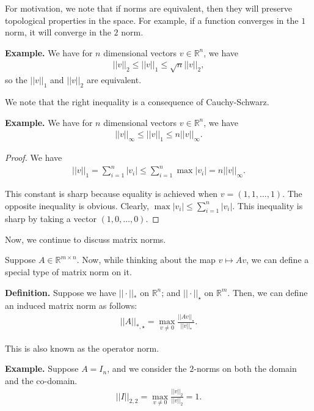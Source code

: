\documentclass{article}
\newcommand{\RR}{\mathbb{R}}
\begin{document}
For motivation, we note that if norms are equivalent, then they will preserve topological properties in the space.  For example, if a function converges in the $1$ norm, it will converge in the $2$ norm.

{\bf Example.} We have for $n$ dimensional vectors $v \in \RR^n$, we have
\begin{align*}
  ||v||_2 \leq ||v||_1 \leq \sqrt{n} ||v||_2,
\end{align*}
so the $||v||_1$ and $||v||_2$ are equivalent.

We note that the right inequality is a consequence of Cauchy-Schwarz.

{\bf Example.} We have for $n$ dimensional vectors $v \in \RR^n$, we have
\begin{align*}
  ||v||_{\infty} \leq ||v||_1 \leq n ||v||_{\infty}.
\end{align*}

\begin{proof}
  We have
  \begin{align*}
    ||v||_1 = \sum_{i=1}^{n} |v_i| \leq \sum_{i=1}^{n} \max |v_i| = n ||v||_{\infty}.
  \end{align*}

  This constant is sharp because equality is achieved when $v = (1, 1, \dots, 1)$.  
  The opposite inequality is obvious.  Clearly, $\max |v_i| \leq \sum_{i=1}^{n} |v_i|$.  This inequality is sharp by taking a vector $(1, 0, \dots, 0)$.
\end{proof}

Now, we continue to discuss matrix norms.  

Suppose $A \in \RR^{m \times n}$.  Now, while thinking about the map $v \mapsto Av$, we can define a special type of matrix norm on it.

{\bf Definition.} Suppose we have $|| \cdot ||_{*}$ on $\RR^n$; and $|| \cdot ||_{\star}$ on $\RR^m$.  Then, we can define an induced matrix norm as follows:
\begin{align*}
  ||A||_{*, \star} = \max_{v \neq 0} \frac{||A v||_{\star}}{||v||_{*}}.
\end{align*}

This is also known as the operator norm.

{\bf Example.} Suppose $A = I_n$, and we consider the $2$-norms on both the domain and the co-domain.
\begin{align*}
  || I||_{2, 2} =  \max_{v \neq 0} \frac{||v||_{2}}{||v||_2} = 1.
\end{align*}
\end{document}

